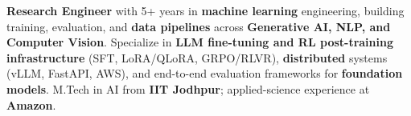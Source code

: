 \documentclass[letter,10pt]{article}
\begin{document}

\textbf{Research Engineer} with 5+ years in \textbf{machine learning} engineering, building training, evaluation, and \textbf{data pipelines} across \textbf{Generative AI, NLP, and Computer Vision}.
Specialize in \textbf{LLM fine-tuning and RL post-training infrastructure} (SFT, LoRA/QLoRA, GRPO/RLVR), \textbf{distributed} systems (vLLM, FastAPI, AWS), and end-to-end evaluation frameworks for \textbf{foundation models}.
M.Tech in AI from \textbf{IIT Jodhpur}; applied-science experience at \textbf{Amazon}.
\end{document}
